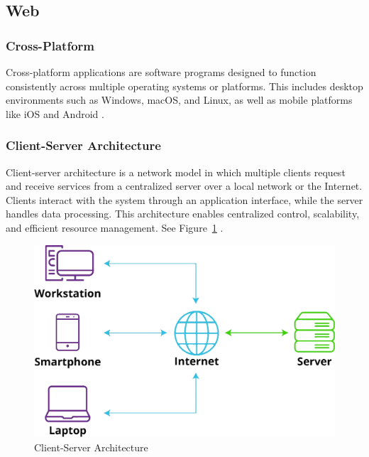 {\subsection{Web}
\label{subsec:web}

\subsubsection*{Cross-Platform}
\label{subsubsec:corss-platform}

Cross-platform applications are software programs designed to function consistently across multiple operating systems or platforms. This includes desktop environments such as Windows, macOS, and Linux, as well as mobile platforms like iOS and Android \cite{sevenpeaks:cross-platform}.

\subsubsection*{Client-Server Architecture}
\label{subsubsec:client-server}

Client-server architecture is a network model in which multiple clients request and receive services from a centralized server over a local network or the Internet. Clients interact with the system through an application interface, while the server handles data processing. This architecture enables centralized control, scalability, and efficient resource management. See Figure~\ref{fig:client-server-architecture} \cite{liquidweb:client-server}.


\begin{figure}[h!]
    \centering
    \includegraphics[width=0.75\linewidth]{figures/theory/client-server-architecture.png}
    \caption[Client-Server Architecture]{Client-Server Architecture \cite{liquidweb:client-server}}
    \label{fig:client-server-architecture}
\end{figure}

}
